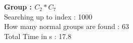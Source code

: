 \textbf{Group : $C_2*C_7$}\\
Searching up to index : 1000\\
How many normal groups are found : 63\\
Total Time in s : 17.8\\
